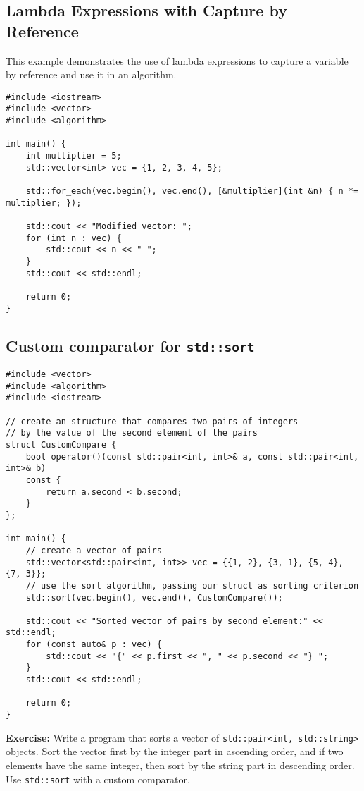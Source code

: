 \documentclass{article}
\begin{document}
\subsection*{Lambda Expressions with Capture by Reference}
This example demonstrates the use of lambda expressions to capture a variable by reference and use it in an algorithm.

\begin{verbatim}
#include <iostream>
#include <vector>
#include <algorithm>

int main() {
    int multiplier = 5;
    std::vector<int> vec = {1, 2, 3, 4, 5};

    std::for_each(vec.begin(), vec.end(), [&multiplier](int &n) { n *= multiplier; });

    std::cout << "Modified vector: ";
    for (int n : vec) {
        std::cout << n << " ";
    }
    std::cout << std::endl;

    return 0;
}
\end{verbatim}

\subsection*{Custom comparator for \texttt{std::sort}}

\begin{verbatim}
#include <vector>
#include <algorithm>
#include <iostream>

// create an structure that compares two pairs of integers
// by the value of the second element of the pairs
struct CustomCompare {
    bool operator()(const std::pair<int, int>& a, const std::pair<int, int>& b) 
    const {
        return a.second < b.second;
    }
};

int main() {
    // create a vector of pairs
    std::vector<std::pair<int, int>> vec = {{1, 2}, {3, 1}, {5, 4}, {7, 3}};
    // use the sort algorithm, passing our struct as sorting criterion
    std::sort(vec.begin(), vec.end(), CustomCompare());

    std::cout << "Sorted vector of pairs by second element:" << std::endl;
    for (const auto& p : vec) {
        std::cout << "{" << p.first << ", " << p.second << "} ";
    }
    std::cout << std::endl;

    return 0;
}
\end{verbatim}

\textbf{Exercise:} Write a program that sorts a vector of \texttt{std::pair<int, std::string>} objects. Sort the vector first by the integer part in ascending order, and if two elements have the same integer, then sort by the string part in descending order. Use \texttt{std::sort} with a custom comparator.
\end{document}
